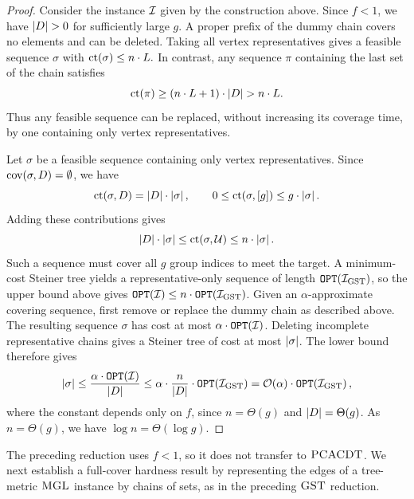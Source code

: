 \begin{proof}
    Consider the instance $\mathcal{I}$ given by the construction above. Since $f<1$, we have $\spr{D}>0$ for sufficiently large $g$.
    A proper prefix of the dummy chain covers no elements and can be deleted. Taking all vertex representatives gives a feasible sequence $\sigma$ with $
        \operatorname{ct}\mathopen{}\left( \sigma \right)\leq n\cdot L.$
    In contrast, any sequence $\pi$ containing the last set of the chain satisfies
    \[
        \coverageTime\br{\pi}\geq\br{n\cdot L+1}\cdot\spr{D}>n\cdot L.
    \]
    Thus any feasible sequence can be replaced, without increasing its coverage time, by one containing only vertex representatives.

    Let $\sigma$ be a feasible sequence containing only vertex representatives. Since $\operatorname{cov}\mathopen{}\left( \sigma,D \right)=\emptyset$, we have
    \[
        \operatorname{ct}\mathopen{}\left( \sigma,D \right)=\mathopen{}\left| D \right|\cdot\mathopen{}\left| \sigma \right|,
        \qquad
        0\leq\operatorname{ct}\mathopen{}\left( \sigma,[g] \right)\leq g\cdot\mathopen{}\left| \sigma \right|.
    \]
    Adding these contributions gives
    \[
        \mathopen{}\left| D \right|\cdot\mathopen{}\left| \sigma \right|
        \leq\operatorname{ct}\mathopen{}\left( \sigma,\mathcal{U} \right)
        \leq n\cdot\mathopen{}\left| \sigma \right|.
    \]
    Such a sequence must cover all $g$ group indices to meet the target. A minimum-cost Steiner tree yields a representative-only sequence of length $\texttt{OPT}\mathopen{}\left( \mathcal{I}_{\mathrm{GST}} \right)$, so the upper bound above gives $\texttt{OPT}\mathopen{}\left( \mathcal{I} \right)\leq n\cdot\texttt{OPT}\mathopen{}\left( \mathcal{I}_{\mathrm{GST}} \right)$. Given an $\alpha$-approximate covering sequence, first remove or replace the dummy chain as described above. The resulting sequence $\sigma$ has cost at most $\alpha\cdot\texttt{OPT}\mathopen{}\left( \mathcal{I} \right)$. Deleting incomplete representative chains gives a Steiner tree of cost at most $\mathopen{}\left| \sigma \right|$. The lower bound therefore gives
    \[
        \mathopen{}\left| \sigma \right|\leq\frac{\alpha\cdot\texttt{OPT}\mathopen{}\left( \mathcal{I} \right)}{\mathopen{}\left| D \right|}
        \leq\alpha\cdot\frac{n}{\mathopen{}\left| D \right|}\cdot\texttt{OPT}\mathopen{}\left( \mathcal{I}_{\mathrm{GST}} \right)
        =\mathcal{O}\mathopen{}\left( \alpha \right)\cdot\texttt{OPT}\mathopen{}\left( \mathcal{I}_{\mathrm{GST}} \right),
    \]
    where the constant depends only on $f$, since $n=\Theta(g)$ and $\mathopen{}\left| D \right|=\Theta(g)$. As $n=\Theta(g)$, we have $\log n=\Theta(\log g)$.

\end{proof}
The preceding reduction uses $f<1$, so it does not transfer to $\textup{\textsc{PCACDT}}$. We next establish a full-cover hardness result by representing the edges of a tree-metric $\textup{\textsc{MGL}}$ instance by chains of sets, as in the preceding $\textup{\textsc{GST}}$ reduction.


